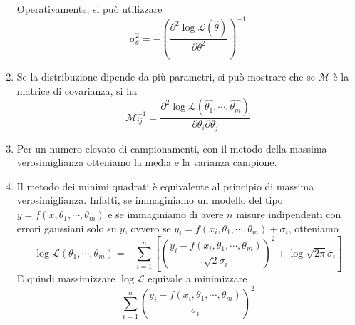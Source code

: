 \documentclass[a4paper,11pt]{article}
\begin{document}
\begin{enumerate}[resume]
	Operativamente, si può utilizzare
	\[\sigma_\theta^2=-\left(\frac{\partial^2\log\mathcal{L}(\hat{\theta})}{\partial\theta^2}\right)^{-1}\]
	\item Se la distribuzione dipende da più parametri, si può mostrare che se $\mathcal{M}$ è la matrice di covarianza, si ha
	\[\mathcal{M}^{-1}_{ij}=\frac{\partial^2\log\mathcal{L}(\hat{\theta_1},\cdots,\hat{\theta_m})}{\partial \theta_i\partial\theta_j}\]
	\item Per un numero elevato di campionamenti, con il metodo della massima verosimiglianza otteniamo la media e la varianza campione. 
	\item Il metodo dei minimi quadrati è equivalente al principio di massima verosimiglianza. Infatti, se immaginiamo un modello del tipo $y=f(x,\theta_1,\cdots,\theta_m)$ e se immaginiamo di avere $n$ misure indipendenti con errori gaussiani solo su $y$, ovvero se $y_i=f(x_i,\theta_1,\cdots,\theta_m)+\sigma_i$, otteniamo
	\[\log\mathcal{L}(\theta_1,\cdots,\theta_m)=-\sum_{i=1}^{n}\left[\left(\frac{y_i-f(x_i,\theta_1,\cdots,\theta_m)}{\sqrt{2}\sigma_i}\right)^2+\log\sqrt{2\pi}\sigma_i\right]\]
	E quindi massimizzare $\log\mathcal{L}$ equivale a minimizzare
	\[\sum_{i=1}^{n}\left(\frac{y_i-f(x_i,\theta_1,\cdots,\theta_m)}{\sigma_i}\right)^2\]
\end{enumerate}

\newpage
\end{document}
